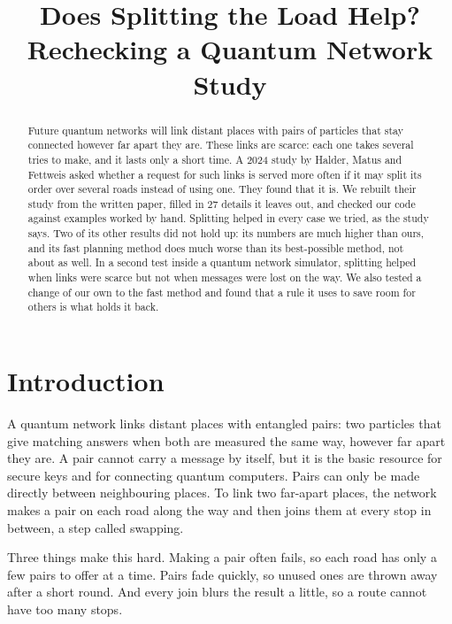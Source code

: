 \documentclass[conference]{IEEEtran}
\begin{document}
\title{Does Splitting the Load Help?\\ Rechecking a Quantum Network Study}

\author{
}

\maketitle

\begin{abstract}
Future quantum networks will link distant places with pairs of particles that stay connected however far apart they are. These links are scarce: each one takes several tries to make, and it lasts only a short time. A 2024 study by Halder, Matus and Fettweis asked whether a request for such links is served more often if it may split its order over several roads instead of using one. They found that it is. We rebuilt their study from the written paper, filled in 27 details it leaves out, and checked our code against examples worked by hand. Splitting helped in every case we tried, as the study says. Two of its other results did not hold up: its numbers are much higher than ours, and its fast planning method does much worse than its best-possible method, not about as well. In a second test inside a quantum network simulator, splitting helped when links were scarce but not when messages were lost on the way. We also tested a change of our own to the fast method and found that a rule it uses to save room for others is what holds it back.
\end{abstract}

\section{Introduction}
A quantum network links distant places with entangled pairs: two particles that give matching answers when both are measured the same way, however far apart they are. A pair cannot carry a message by itself, but it is the basic resource for secure keys and for connecting quantum computers. Pairs can only be made directly between neighbouring places. To link two far-apart places, the network makes a pair on each road along the way and then joins them at every stop in between, a step called swapping.

Three things make this hard. Making a pair often fails, so each road has only a few pairs to offer at a time. Pairs fade quickly, so unused ones are thrown away after a short round. And every join blurs the result a little, so a route cannot have too many stops.
\end{document}
